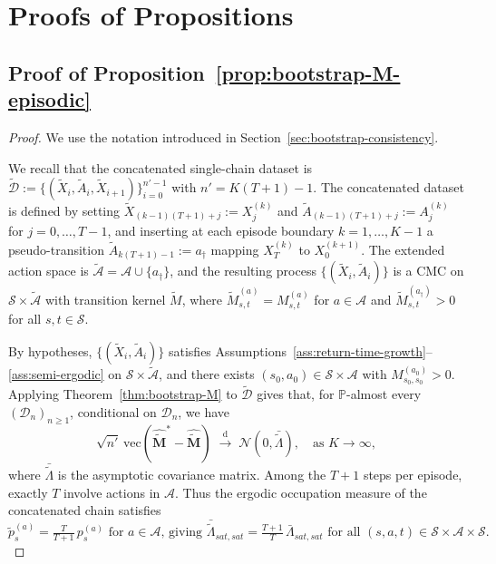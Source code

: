 \documentclass{article}
\numberwithin{equation}{section}
\begin{document}
\section{Proofs of Propositions}
\label{app:proof-corollaries}

\subsection{Proof of Proposition~\ref{prop:bootstrap-M-episodic}}
\label{app:proof-cor-episodic}

\begin{proof}
We use the notation introduced in Section~\ref{sec:bootstrap-consistency}.

We recall that the concatenated single-chain dataset is $\tilde{\mathcal{D}} := \{(\widetilde{X}_i,\widetilde{A}_i,\widetilde{X}_{i+1})\}_{i=0}^{n'-1}$ with $n'=K(T+1)-1$.
The concatenated dataset is defined by setting $\widetilde{X}_{(k-1)(T+1)+j}:=X_j^{(k)}$ and $\widetilde{A}_{(k-1)(T+1)+j}:=A_j^{(k)}$ for $j=0,\ldots,T-1$, and inserting at each episode boundary $k=1,\ldots,K-1$ a pseudo-transition $\widetilde{A}_{k(T+1)-1}:=a_\dagger$ mapping $X_T^{(k)}$ to $X_0^{(k+1)}$.
The extended action space is $\widetilde{\mathcal{A}}=\mathcal{A}\cup\{a_\dagger\}$, and the resulting process $\{(\widetilde{X}_i,\widetilde{A}_i)\}$ is a CMC on $\mathcal{S}\times\widetilde{\mathcal{A}}$ with transition kernel $\widetilde{M}$, where $\widetilde{M}^{(a)}_{s,t}=M^{(a)}_{s,t}$ for $a\in\mathcal{A}$ and $\widetilde{M}^{(a_\dagger)}_{s,t}>0$ for all $s,t\in\mathcal{S}$.

By hypotheses, $\{(\widetilde{X}_i,\widetilde{A}_i)\}$ satisfies Assumptions~\ref{ass:return-time-growth}--\ref{ass:semi-ergodic} on $\mathcal{S}\times\widetilde{\mathcal{A}}$, and there exists $(s_0,a_0)\in\mathcal{S}\times\mathcal{A}$ with $M_{s_0,s_0}^{(a_0)}>0$.
Applying Theorem~\ref{thm:bootstrap-M} to $\tilde{\mathcal{D}}$ gives that, for $\mathbb{P}$-almost every $(\mathcal{D}_n)_{n\ge1}$, conditional on $\mathcal{D}_n$, we have
\[
\sqrt{n'}\,\mathrm{vec}(\hat{\widetilde{\mathbf{M}}}^\ast - \hat{\widetilde{\mathbf{M}}})
\;\xrightarrow{\mathrm{d}}\;\mathcal{N}(0,\bar{\widetilde\Lambda}), \quad \text{as }K\to\infty,
\]
where $\bar{\widetilde\Lambda}$ is the asymptotic covariance matrix.
Among the $T+1$ steps per episode, exactly $T$ involve actions in $\mathcal{A}$. Thus the ergodic occupation measure of the concatenated chain satisfies 
\[
\tilde p_s^{(a)}=\tfrac{T}{T+1}\,p_s^{(a)} \text{ for $a\in\mathcal{A}$, giving }\bar{\widetilde\Lambda}_{sat,sat}=\tfrac{T+1}{T}\,\bar\Lambda_{sat,sat} \text{ for all $(s,a,t) \in \mathcal S \times \mathcal A \times \mathcal S$.}
\]


\end{proof}
\end{document}

